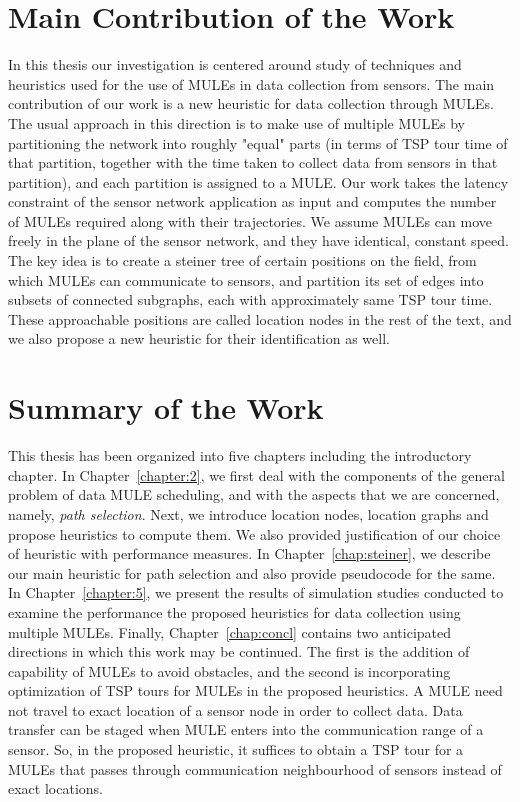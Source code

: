 \section{Main Contribution of the Work}
In this thesis our investigation is centered around study of techniques and heuristics used for the use of MULEs in data collection from sensors. The main contribution of our work is a new heuristic for data collection through MULEs. The usual approach in this direction is to make use of multiple MULEs by partitioning the network into roughly "equal" parts (in terms of TSP tour time of that partition, together with the time taken to collect data from sensors in that partition), and each partition is assigned to a MULE. Our work takes the latency constraint of the sensor network application as input and computes the number of MULEs required along with their trajectories. We assume MULEs can move freely in the plane of the sensor network, and they have identical, constant speed. The key idea is to create a steiner tree of certain positions on the field, from which MULEs can communicate to sensors, and partition its set of edges into subsets of connected subgraphs, each with approximately same TSP tour time. These approachable positions are called location nodes in the rest of the text, and we also propose a new heuristic for their identification as well.

\section{Summary of the Work}
This thesis has been organized into five chapters including the 
introductory chapter. In Chapter~\ref{chapter:2}, we first deal with the components of the general problem of data MULE scheduling, and with the aspects that we are concerned, namely, {\em path selection}. Next, we introduce location nodes, location graphs and propose heuristics to compute them. We also provided justification of our choice of heuristic with performance measures. In Chapter~\ref{chap:steiner}, we describe our main heuristic for path selection and also provide pseudocode for the same. 
In Chapter~\ref{chapter:5}, we present the results of simulation studies conducted to examine the performance the proposed heuristics for data collection using multiple MULEs. Finally, 
Chapter~\ref{chap:concl} contains two anticipated directions in which this work may be continued. 
The first is the addition of capability of MULEs to avoid obstacles, and the second is incorporating optimization of TSP tours for MULEs in the proposed heuristics. A MULE need not travel to exact location of a sensor node in order to collect data. Data transfer can be staged when MULE enters into the communication range of a sensor. So, in the proposed heuristic, it suffices to obtain a TSP tour for a MULEs that passes through communication neighbourhood of sensors instead of exact locations. %
